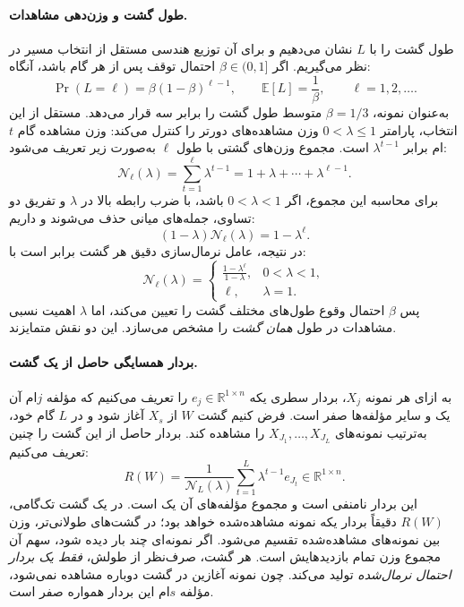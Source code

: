 \paragraph{طول گشت و وزن‌دهی مشاهدات.}
طول گشت را با $L$ نشان می‌دهیم و برای آن توزیع هندسی مستقل از انتخاب مسیر در نظر می‌گیریم. اگر $\beta\in(0,1]$ احتمال توقف پس از هر گام باشد، آنگاه:
\begin{equation}\label{cmp:eq:ch3-geometric-length}
\Pr(L=\ell)=\beta(1-\beta)^{\ell-1},\qquad
\mathbb E[L]=\frac{1}{\beta},\qquad \ell=1,2,\ldots.
\end{equation}
به‌عنوان نمونه، $\beta=1/3$ متوسط طول گشت را برابر سه قرار می‌دهد. مستقل از این انتخاب، پارامتر $0<\lambda\le1$ وزن مشاهده‌های دورتر را کنترل می‌کند: وزن مشاهده گام $t$ام برابر $\lambda^{t-1}$ است. مجموع وزن‌های گشتی با طول $\ell$ به‌صورت زیر تعریف می‌شود:
\begin{equation}\label{cmp:eq:ch3-walk-weight-normalizer}
\mathcal N_\ell(\lambda)=\sum_{t=1}^{\ell}\lambda^{t-1}
=1+\lambda+\cdots+\lambda^{\ell-1}.
\end{equation}
برای محاسبه این مجموع، اگر $0<\lambda<1$ باشد، با ضرب رابطه بالا در $\lambda$ و تفریق دو تساوی، جمله‌های میانی حذف می‌شوند و داریم:
\begin{equation}\label{cmp:eq:ch3-walk-weight-normalizer-telescoping}
(1-\lambda)\mathcal N_\ell(\lambda)=1-\lambda^\ell.
\end{equation}
در نتیجه، عامل نرمال‌سازی دقیق هر گشت برابر است با:
\begin{equation}\label{cmp:eq:ch3-walk-weight-normalizer-closed}
\mathcal N_\ell(\lambda)=
\begin{cases}
\displaystyle\frac{1-\lambda^\ell}{1-\lambda},&0<\lambda<1,\\[5pt]
\ell,&\lambda=1.
\end{cases}
\end{equation}
پس $\beta$ احتمال وقوع طول‌های مختلف گشت را تعیین می‌کند، اما $\lambda$ اهمیت نسبی مشاهدات در طول \emph{همان گشت} را مشخص می‌سازد. این دو نقش متمایزند.

\paragraph{بردار همسایگی حاصل از یک گشت.}
به ازای هر نمونه $X_j$، بردار سطری یکه $e_j\in\mathbb R^{1\times n}$ را تعریف می‌کنیم که مؤلفه $j$ام آن یک و سایر مؤلفه‌ها صفر است. فرض کنیم گشت $W$ از $X_s$ آغاز شود و در $L$ گام خود، به‌ترتیب نمونه‌های $X_{J_1},\ldots,X_{J_L}$ را مشاهده کند. بردار حاصل از این گشت را چنین تعریف می‌کنیم:
\begin{equation}\label{cmp:eq:ch3-walk-vector}
R(W)=\frac{1}{\mathcal N_L(\lambda)}
\sum_{t=1}^{L}\lambda^{t-1}e_{J_t}\in\mathbb R^{1\times n}.
\end{equation}
این بردار نامنفی است و مجموع مؤلفه‌های آن یک است. در یک گشت تک‌گامی، $R(W)$ دقیقاً بردار یکه نمونه مشاهده‌شده خواهد بود؛ در گشت‌های طولانی‌تر، وزن بین نمونه‌های مشاهده‌شده تقسیم می‌شود. اگر نمونه‌ای چند بار دیده شود، سهم آن مجموع وزن تمام بازدیدهایش است. هر گشت، صرف‌نظر از طولش، \emph{فقط یک بردار احتمال نرمال‌شده} تولید می‌کند. چون نمونه آغازین در گشت دوباره مشاهده نمی‌شود، مؤلفه $s$ام این بردار همواره صفر است.

